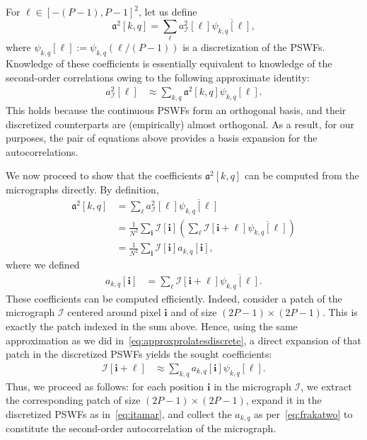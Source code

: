 \documentclass[12pt]{article}
\newcommand{\1}{\mathbf{1}}
\newcommand{\II}{\mathcal{I}}
\newcommand{\mb}{\mathbf}
\newcommand*\Bell{\ensuremath{\boldsymbol\ell}}
\theoremstyle{plain}
\theoremstyle{definition}
\theoremstyle{remark}
\theoremstyle{plain}
\theoremstyle{remark}
\theoremstyle{plain}
\theoremstyle{plain}
\begin{document}
For $\Bell \in [-(P-1), P-1]^2$, let us define 
\begin{equation} \label{eq:PSWF_expansion}
\mathfrak{a}^2[k, q]  =
\sum_{\Bell}a^2_\II[\Bell]\overline{\psi_{k,q}[\Bell]}, 
\end{equation}
where $\psi_{k,q}[\Bell] := \psi_{k,q}(\Bell/(P-1))$ is a discretization of the PSWFs. 
Knowledge of these coefficients is essentially equivalent to knowledge of the second-order correlations owing to the following approximate identity:
\begin{align}
a^2_\II[\Bell] & \approx \sum_{k,q}\mathfrak{a}^2[k,q]\psi_{k,q}[\Bell].
\label{eq:approxprolatesdiscrete}
\end{align}
This holds because the continuous PSWFs form an orthogonal basis, and their discretized counterparts are (empirically) almost orthogonal. As a result, for our purposes, the pair of equations above provides a basis expansion for the autocorrelations.

We now proceed to show that the coefficients $\mathfrak{a}^2[k, q]$ can be computed from the micrographs directly.
By definition,
\begin{align}
\mathfrak{a}^2[k,q] & =\sum_{\Bell} a^2_\II[\Bell] \overline{\psi_{k,q}[\Bell]} \nonumber\\
& = \frac{1}{N^2}\sum_{\mb i}\II[\mb i]\left(\sum_{\Bell}\II[\mb i+\Bell]\overline{\psi_{k,q}[\Bell]}\right) \nonumber \\
& = \frac{1}{N^2}\sum_{\mb i}\II[\mb i] a_{k,q}[\mb i], \label{eq:frakatwo}
\end{align}
where we defined
\begin{align}
a_{k,q}[\mb i] & = \sum_{\Bell}\II[\mb i+\Bell]\overline{\psi_{k,q}[\Bell]}.
\label{eq:patchcoefficients}
\end{align}
These coefficients can be computed efficiently. Indeed, consider a patch of the micrograph $\II$ centered around pixel $\mb i$ and of size $(2P-1) \times (2P-1)$. This is exactly the patch indexed in the sum above. Hence, using the same approximation as we did in~\eqref{eq:approxprolatesdiscrete}, a direct expansion of that patch in the discretized PSWFs yields the sought coefficients:
\begin{align}
\II[\mb i+\Bell] & \approx \sum_{k,q} a_{k,q}[\mb i] \psi_{k,q}[\Bell]. \label{eq:itamar}
\end{align}
Thus, we proceed as follows:
for each position $\mb i$ in the micrograph $\II$, we extract the corresponding patch of size $(2P-1) \times (2P-1)$, expand it in the discretized PSWFs as in~\eqref{eq:itamar}, and collect the $a_{k,q}$ as per~\eqref{eq:frakatwo} to constitute the second-order autocorrelation of the micrograph.
\end{document}
